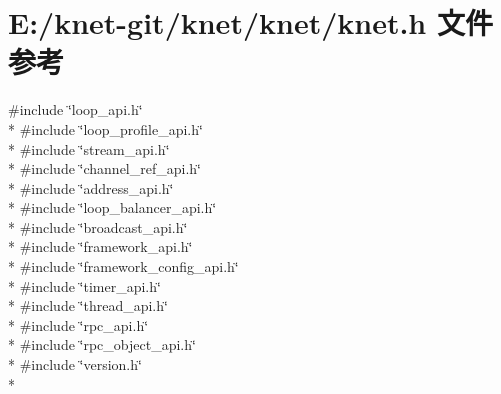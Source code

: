 \hypertarget{a00066}{}\section{E\+:/knet-\/git/knet/knet/knet.h 文件参考}
\label{a00066}
{\ttfamily \#include \char`\"{}loop\+\_\+api.\+h\char`\"{}}\\*
{\ttfamily \#include \char`\"{}loop\+\_\+profile\+\_\+api.\+h\char`\"{}}\\*
{\ttfamily \#include \char`\"{}stream\+\_\+api.\+h\char`\"{}}\\*
{\ttfamily \#include \char`\"{}channel\+\_\+ref\+\_\+api.\+h\char`\"{}}\\*
{\ttfamily \#include \char`\"{}address\+\_\+api.\+h\char`\"{}}\\*
{\ttfamily \#include \char`\"{}loop\+\_\+balancer\+\_\+api.\+h\char`\"{}}\\*
{\ttfamily \#include \char`\"{}broadcast\+\_\+api.\+h\char`\"{}}\\*
{\ttfamily \#include \char`\"{}framework\+\_\+api.\+h\char`\"{}}\\*
{\ttfamily \#include \char`\"{}framework\+\_\+config\+\_\+api.\+h\char`\"{}}\\*
{\ttfamily \#include \char`\"{}timer\+\_\+api.\+h\char`\"{}}\\*
{\ttfamily \#include \char`\"{}thread\+\_\+api.\+h\char`\"{}}\\*
{\ttfamily \#include \char`\"{}rpc\+\_\+api.\+h\char`\"{}}\\*
{\ttfamily \#include \char`\"{}rpc\+\_\+object\+\_\+api.\+h\char`\"{}}\\*
{\ttfamily \#include \char`\"{}version.\+h\char`\"{}}\\*
